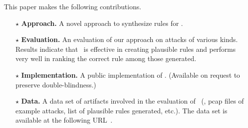 \documentclass[conference]{IEEEtran}
\begin{document}




This paper makes the following contributions.

\newcommand{\Contrib}[1]{$\star$#1}
\begin{itemize}[topsep=.2ex,itemsep=.2ex,leftmargin=0.8em]

\item[\Contrib{}]\textbf{Approach.} A novel approach to synthesize
  rules for \nids.

\item[\Contrib{}]\textbf{Evaluation.} An evaluation of our approach on
  attacks of various kinds. Results indicate that \tname\ is effective
  in creating plausible rules and performs very well in ranking the
  correct rule among those generated.

\item[\Contrib{}]\textbf{Implementation.} A public implementation of
  \tname. (Available on request to preserve double-blindness.)

\item[\Contrib{}]\textbf{Data.} A data set of artifacts involved in
  the evaluation of \tname\ (\eg{}, pcap files of example attacks, list
  of plausible rules generated, etc.). The data set is available at
  the following URL~\ourdataset.
  
\end{itemize}


\section{\nids}
\label{sec:background}
\end{document}
